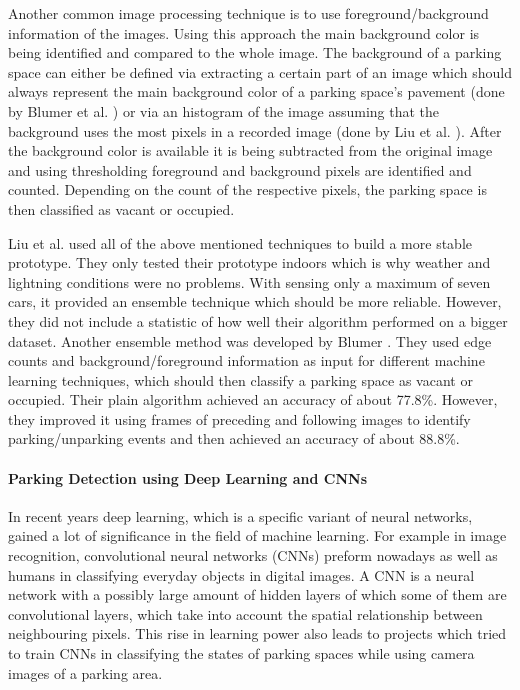 Another common image processing technique is to use foreground/background information of the images. Using this approach the main background color is being identified and compared to the whole image. The background of a parking space can either be defined via extracting a certain part of an image which should always represent the main background color of a parking space's pavement (done by Blumer et al. \cite{Blumer2012}) or via an histogram of the image assuming that the background uses the most pixels in a recorded image (done by Liu et al. \cite{stationary_camera_sensing}). After the background color is available it is being subtracted from the original image and using thresholding foreground and background pixels are identified and counted. Depending on the count of the respective pixels, the parking space is then classified as vacant or occupied.

Liu et al. \cite{stationary_camera_sensing} used all of the above mentioned techniques to build a more stable prototype. They only tested their prototype indoors which is why weather and lightning conditions were no problems. With sensing only a maximum of seven cars, it provided an ensemble technique which should be more reliable. However, they did not include a statistic of how well their algorithm performed on a bigger dataset. Another ensemble method was developed by Blumer \cite{Blumer2012}. They used edge counts and background/foreground information as input for different machine learning techniques, which should then classify a parking space as vacant or occupied. Their plain algorithm achieved an accuracy of about 77.8\%. However, they improved it using frames of preceding and following images to identify parking/unparking events and then achieved an accuracy of about 88.8\%.


\paragraph{Parking Detection using Deep Learning and CNNs}

In recent years deep learning, which is a specific variant of neural networks, gained a lot of significance in the field of machine learning. For example in image recognition, convolutional neural networks (CNNs) preform nowadays as well as humans in classifying everyday objects in digital images. A CNN is a neural network with a possibly large amount of hidden layers of which some of them are convolutional layers, which take into account the spatial relationship between neighbouring pixels. This rise in learning power also leads to projects which tried to train CNNs in classifying the states of parking spaces while using camera images of a parking area.

